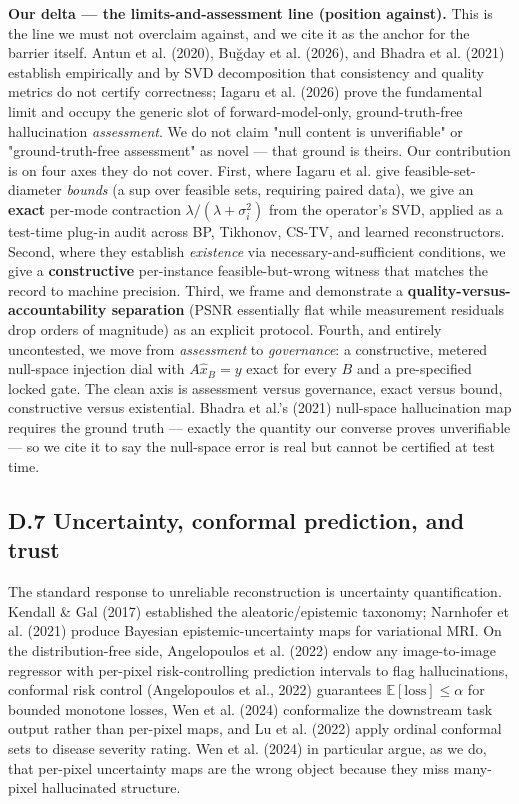 \documentclass[11pt]{article}
\begin{document}
\textbf{Our delta --- the limits-and-assessment line (position against).} This is the line we must not overclaim against, and we cite it as the anchor for the barrier itself. Antun et al. (2020), Buğday et al. (2026), and Bhadra et al. (2021) establish empirically and by SVD decomposition that consistency and quality metrics do not certify correctness; Iagaru et al. (2026) prove the fundamental limit and occupy the generic slot of forward-model-only, ground-truth-free hallucination \textit{assessment}. We do not claim "null content is unverifiable" or "ground-truth-free assessment" as novel --- that ground is theirs. Our contribution is on four axes they do not cover. First, where Iagaru et al. give feasible-set-diameter \textit{bounds} (a sup over feasible sets, requiring paired data), we give an \textbf{exact} per-mode contraction $\lambda/(\lambda+\sigma_i^2)$ from the operator's SVD, applied as a test-time plug-in audit across BP, Tikhonov, CS-TV, and learned reconstructors. Second, where they establish \textit{existence} via necessary-and-sufficient conditions, we give a \textbf{constructive} per-instance feasible-but-wrong witness that matches the record to machine precision. Third, we frame and demonstrate a \textbf{quality-versus-accountability separation} (PSNR essentially flat while measurement residuals drop orders of magnitude) as an explicit protocol. Fourth, and entirely uncontested, we move from \textit{assessment} to \textit{governance}: a constructive, metered null-space injection dial with $A\hat{x}_B = y$ exact for every $B$ and a pre-specified locked gate. The clean axis is assessment versus governance, exact versus bound, constructive versus existential. Bhadra et al.'s (2021) null-space hallucination map requires the ground truth --- exactly the quantity our converse proves unverifiable --- so we cite it to say the null-space error is real but cannot be certified at test time.

\subsection*{D.7 Uncertainty, conformal prediction, and trust}

The standard response to unreliable reconstruction is uncertainty quantification. Kendall \& Gal (2017) established the aleatoric/epistemic taxonomy; Narnhofer et al. (2021) produce Bayesian epistemic-uncertainty maps for variational MRI. On the distribution-free side, Angelopoulos et al. (2022) endow any image-to-image regressor with per-pixel risk-controlling prediction intervals to flag hallucinations, conformal risk control (Angelopoulos et al., 2022) guarantees $\mathbb{E}[\mathrm{loss}] \le \alpha$ for bounded monotone losses, Wen et al. (2024) conformalize the downstream task output rather than per-pixel maps, and Lu et al. (2022) apply ordinal conformal sets to disease severity rating. Wen et al. (2024) in particular argue, as we do, that per-pixel uncertainty maps are the wrong object because they miss many-pixel hallucinated structure.
\end{document}
